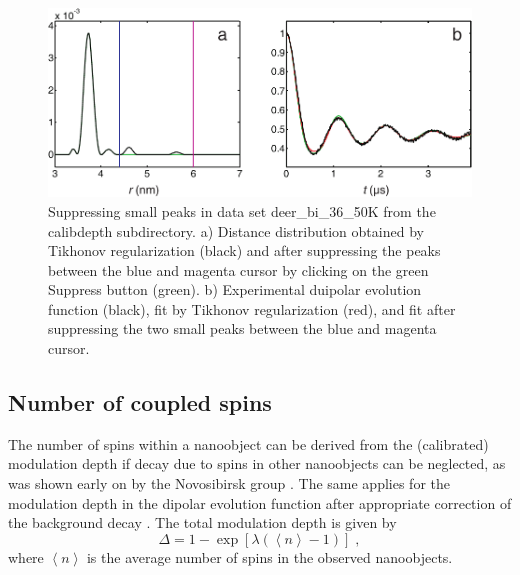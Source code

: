 \documentclass{article}
\begin{document}
\begin{figure}[ht]
 	\begin{center}
  \includegraphics[width=1.0\textwidth]{fig8.pdf}
	\end{center}
	\caption{Suppressing small peaks in data set {\ttfamily deer\_bi\_36\_50K} from the {\ttfamily calibdepth} subdirectory. a) Distance distribution obtained by Tikhonov regularization (black) and after suppressing the peaks between the blue and magenta cursor by clicking on the green {\ttfamily Suppress} button (green). b) Experimental duipolar evolution function (black), fit by Tikhonov regularization (red), and fit after suppressing the two small peaks between the blue and magenta cursor.}
	\label{fig:manfig8}
\end{figure}


\subsection{Number of coupled spins}
\label{numspins}
The number of spins within a nanoobject can be derived from the (calibrated)
modulation depth if decay due to spins in other nanoobjects can be neglected,
as was shown early on by the Novosibirsk group \cite{milov1984}. The same applies for
the modulation depth in the dipolar evolution function after appropriate correction
of the background decay \cite{jeschke2004a}. The total modulation depth is given by
\begin{equation}
	\Delta = 1 - \exp \left[ \lambda \left( \left\langle n \right\rangle - 1 \right) \right] \; ,
\end{equation}
where $\left\langle n \right\rangle$ is the average number of spins in the observed nanoobjects.
 
\end{document}
